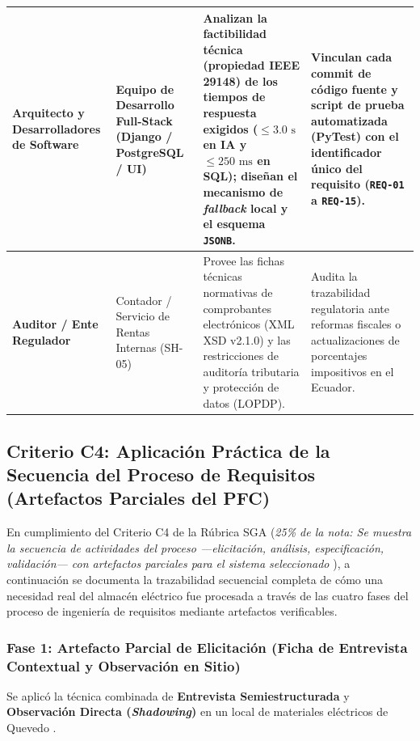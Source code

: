 \begin{table}[htbp]
\begin{tabularx}{\textwidth}{l l Y Y}
\midrule
\textbf{Arquitecto y Desarrolladores de Software} & Equipo de Desarrollo Full-Stack (Django / PostgreSQL / UI) & Analizan la factibilidad técnica (propiedad IEEE 29148) de los tiempos de respuesta exigidos ($\le 3.0\text{ s}$ en IA y $\le 250\text{ ms}$ en SQL); diseñan el mecanismo de \textit{fallback} local y el esquema \texttt{JSONB}. & Vinculan cada commit de código fuente y script de prueba automatizada (PyTest) con el identificador único del requisito (\texttt{REQ-01} a \texttt{REQ-15}). \\
\midrule
\textbf{Auditor / Ente Regulador} & Contador / Servicio de Rentas Internas (SH-05) & Provee las fichas técnicas normativas de comprobantes electrónicos (XML XSD v2.1.0) y las restricciones de auditoría tributaria y protección de datos (LOPDP). & Audita la trazabilidad regulatoria ante reformas fiscales o actualizaciones de porcentajes impositivos en el Ecuador. \\
\bottomrule
\end{tabularx}
\end{table}

\subsection{Criterio C4: Aplicación Práctica de la Secuencia del Proceso de Requisitos (Artefactos Parciales del PFC)}
En cumplimiento del Criterio C4 de la Rúbrica SGA (\textit{25\% de la nota: Se muestra la secuencia de actividades del proceso —elicitación, análisis, especificación, validación— con artefactos parciales para el sistema seleccionado} \cite{ieee29148, pohl2025}), a continuación se documenta la trazabilidad secuencial completa de cómo una necesidad real del almacén eléctrico fue procesada a través de las cuatro fases del proceso de ingeniería de requisitos mediante artefactos verificables.

\subsubsection{Fase 1: Artefacto Parcial de Elicitación (Ficha de Entrevista Contextual y Observación en Sitio)}
Se aplicó la técnica combinada de \textbf{Entrevista Semiestructurada} y \textbf{Observación Directa (\textit{Shadowing})} en un local de materiales eléctricos de Quevedo \cite{pohl2025, wiegers2013}.

